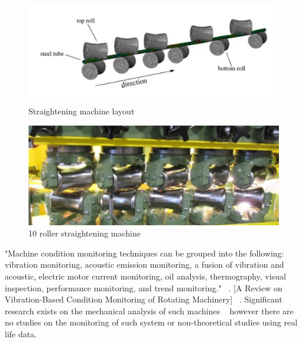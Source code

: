 \documentclass[]{article}
\begin{document}

\begin{figure}[H]
	\centering
	\includegraphics[width=\textwidth]{straightening3.jpg}
	\caption{Straightening machine layout~\cite{ma2021analysis}}
	\label{straighteningImage3}
\end{figure}


\begin{figure}[H]
	\centering
	\includegraphics[width=\textwidth, keepaspectratio]{Straightening6.png}
	\caption{10 roller straightening machine~\cite{zhang2019modeling}}
	\label{straighteningImage6}
\end{figure}

"Machine condition monitoring techniques can be grouped into the following: vibration monitoring, acoustic emission monitoring, a fusion of vibration and acoustic, electric motor current monitoring, oil analysis, thermography, visual inspection, performance monitoring, and trend monitoring." ~\cite{soualhi2021novel}.
[A Review on Vibration-Based Condition Monitoring of Rotating Machinery] ~\cite{yoshimura2009effect}. 
Significant research exists on the mechanical analysis of such machines ~\cite{kato2014straightening, ma2020effect, ma2021analysis, yu2018theoretical, das1991mechanics} however there are no studies on the monitoring of such system or non-theoretical studies using real life data.
\end{document}
